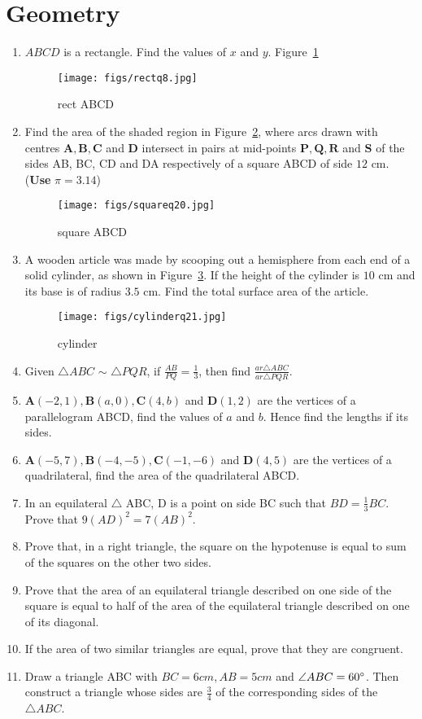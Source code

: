 \documentclass{article}
\let\vec\mathbf
\newcommand{\figref}[1]{Figure~\ref{#1}}
\begin{document}
	\section{Geometry}
	\begin{enumerate}[label=(\roman*)]
	\item $ABCD$ is a rectangle. Find the values of $x$ and $y$.
		\figref{fig:Fig1}
	\begin{figure}[H]
		\centering
		\texttt{[image: figs/rectq8.jpg]}
		\caption{rect ABCD}
		\label{fig:Fig1}
	\end{figure}
\item Find the area of the shaded region in \figref{fig:Fig2}, where arcs drawn with centres $\vec{A,B,C}$ and $\vec{D}$ intersect in pairs at mid-points $\vec{P, Q, R}$ and $\vec{S}$ of the sides AB, BC, CD and DA respectively of a square ABCD of side $12$ cm. ({\textbf{Use}}  $\pi  = 3.14  $)
	\begin{figure}[H]
		\centering
		\texttt{[image: figs/squareq20.jpg]}
		\caption{square ABCD}
		\label{fig:Fig2}
	\end{figure}
\item A wooden article was made by scooping out a hemisphere from each end of a solid cylinder, as shown in \figref{fig:Fig3}. If the height of the cylinder is $10$ cm and its base is of radius $3.5$ cm. Find the total surface area of the article.
	
	\begin{figure}[H]
		\centering
		\texttt{[image: figs/cylinderq21.jpg]}
		\caption{cylinder}
		\label{fig:Fig3}
	\end{figure} 
	\item Given $\triangle ABC$ $\sim$  $\triangle PQR$, if $\frac{AB}{PQ} = \frac{1}{3}$, then find $\frac{ar \triangle ABC}{ar \triangle PQR}$.
	\item $\vec{A}(-2,1), \vec{B}(a,0), \vec{C}(4,b)$ and  $\vec{D}(1,2)$ are the vertices of a parallelogram {ABCD}, find the values of $a$ and $b$. Hence find the lengths if its sides.
	\item $\vec{A}(-5,7), \vec{B}(-4,-5), \vec{C}(-1,-6)$ and $\vec{D}(4,5)$ are the vertices of a quadrilateral, find the area of the quadrilateral ABCD.
	\item In an equilateral $\triangle$ ABC, D is a point on side BC such that $ BD =\frac{1}{3}BC$. Prove that $9(AD)^2 = 7(AB)^2$.
	\item Prove that, in a right triangle, the  square on the hypotenuse is equal to sum of the squares on the other two sides.
	\item Prove that the area of an equilateral triangle described on one side of the square is equal to half of the area of the equilateral triangle described on one of its diagonal.
	\item If the area of two similar triangles are equal, prove that they are congruent.
	\item Draw a triangle ABC with $BC=6 cm, AB=5 cm$ and $\angle{ABC}=60\degree$. Then construct a triangle whose sides are $\frac{3}{4}$ of the corresponding sides of the $\triangle ABC$.
\end{enumerate}
\end{document}
